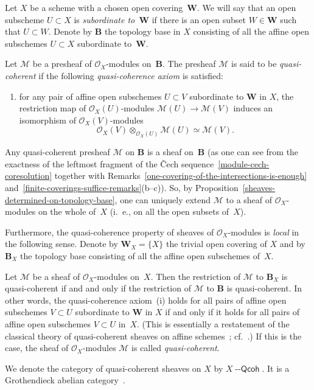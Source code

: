 \documentclass[12pt,a4paper]{amsart}
\newcommand{\+}{\nobreakdash-}
\renewcommand{\:}{\colon}
\newcommand{\rarrow}{\longrightarrow}
\newcommand{\ot}{\otimes}
\newcommand{\Qcoh}{{\operatorname{\mathsf{--Qcoh}}}}
\newcommand{\bB}{\mathbf B}
\newcommand{\bW}{\mathbf W}
\newcommand{\cO}{\mathcal O}
\newcommand{\cM}{\mathcal M}
\theoremstyle{plain}
\theoremstyle{definition}
\begin{document}
 Let $X$ be a scheme with a chosen open covering~$\bW$.
 We will say that an open subscheme $U\subset X$ is \emph{subordinate
to\/~$\bW$} if there is an open subset $W\in\bW$ such that $U\subset W$.
 Denote by $\bB$ the topology base in $X$ consisting of all the affine
open subschemes $U\subset X$ subordinate to~$\bW$.

 Let $\cM$ be a presheaf of $\cO_X$\+modules on~$\bB$.
 The presheaf $\cM$ is said to be \emph{quasi-coherent} if
the following \emph{quasi-coherence axiom} is satisfied:
\begin{enumerate}
\renewcommand{\theenumi}{\roman{enumi}}
\item for any pair of affine open subschemes $U\subset V$ subordinate
to $\bW$ in $X$, the restriction map of $\cO_X(U)$\+modules
$\cM(U)\rarrow\cM(V)$ induces an isomorphism of $\cO_X(V)$\+modules
$$
 \cO_X(V)\ot_{\cO_X(U)}\cM(U)\simeq\cM(V).
$$
\end{enumerate}

 Any quasi-coherent presheaf $\cM$ on $\bB$ is a sheaf on~$\bB$ (as one
can see from the exactness of the leftmost fragment of the \v Cech sequence~\eqref{module-cech-coresolution}
together with Remarks~\ref{one-covering-of-the-intersections-is-enough}
and~\ref{finite-coverings-suffice-remarks}(b\+-c)).
 So, by Proposition~\ref{sheaves-determined-on-topology-base}, one
can uniquely extend $\cM$ to a sheaf of $\cO_X$\+modules on the whole
of~$X$ (i.~e., on all the open subsets of~$X$).

 Furthermore, the quasi-coherence property of sheaves of
$\cO_X$\+modules is \emph{local} in the following sense.
 Denote by $\bW_X=\{X\}$ the trivial open covering of $X$ and by
$\bB_X$ the topology base consisting of all the affine open
subschemes of~$X$.

 Let $\cM$ be a sheaf of $\cO_X$\+modules on~$X$.
 Then the restriction of $\cM$ to $\bB_X$ is quasi-coherent if and
and only if the restriction of $\cM$ to $\bB$ is quasi-coherent.
 In other words, the quasi-coherence axiom~(i) holds for all pairs
of affine open subschemes $V\subset U$ subordinate to $\bW$ in $X$
if and only if it holds for all pairs of affine open subschemes
$V\subset U$ in~$X$.
 (This is essentially a restatement of the classical theory of
quasi-coherent sheaves on affine schemes~\cite[Lemma Tag~01IA]{SP};
cf.~\cite[Proposition~3.4.2]{Pform}.)
 If this is the case, the sheaf of $\cO_X$\+modules $\cM$ is called
\emph{quasi-coherent}.

 We denote the category of quasi-coherent sheaves on $X$ by $X\Qcoh$.
 It is a Grothendieck abelian category~\cite[Proposition Tag~077P]{SP}.
\end{document}
